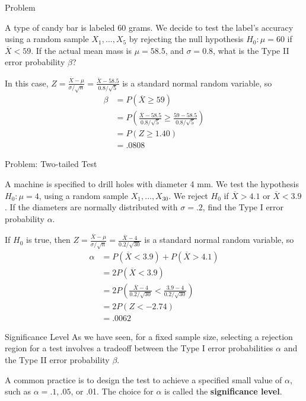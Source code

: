 \documentclass{beamer}
\renewcommand{\emph}{\textbf}
\begin{document}
\begin{frame}{Problem}
\begin{block}{}
A type of candy bar is labeled 60 grams. We decide to test the label's accuracy using a random sample $X_1,\dots,X_5$ by rejecting the null hypothesis $H_0: \mu=60$ if $\overline X<59$. If the actual mean mass is $\mu=58.5$, and $\sigma=0.8$, what is the Type II error probability $\beta$?
\end{block}

\pause In this case, $Z=\frac{\overline X-\mu}{\sigma/\sqrt{n}}=\frac{\overline X-58.5}{0.8/\sqrt{5}}$ is a standard normal random variable, \pause so
\begin{align*}
\beta &= P(\overline X\geq 59) \\
&= P\left(\frac{\overline X-58.5}{0.8/\sqrt5} \geq \frac{59-58.5}{0.8/\sqrt5}\right)\\
&= P(Z \geq 1.40) \\
&= .0808
\end{align*}

\end{frame}

\begin{frame}{Problem: Two-tailed Test}
\begin{block}{}
A machine is specified to drill holes with diameter 4 mm. We test the hypothesis $H_0: \mu=4$, using a random sample $X_1,\dots,X_{30}$. We reject $H_0$ if $\overline X>4.1$ or $\overline X<3.9$. If the diameters are normally distributed with $\sigma=.2$, find the Type I error probability $\alpha$.
\end{block}

\pause If $H_0$ is true, then $Z=\frac{\overline X-\mu}{\sigma/\sqrt{n}}=\frac{\overline X-4}{0.2/\sqrt{30}}$ is a standard normal random variable, \pause so
\begin{align*}
\alpha &= P(\overline X<3.9)+P(\overline X>4.1) \\
&= 2P(\overline X<3.9) \\
&= 2P\left(\frac{\overline X-4}{0.2/\sqrt{30}} < \frac{3.9-4}{0.2/\sqrt{30}}\right)\\
&= 2P(Z < -2.74) \\
&= .0062
\end{align*}
\end{frame}

\begin{frame}{Significance Level}
As we have seen, for a fixed sample size, selecting a rejection region for a test involves a tradeoff between the Type I error probabilities $\alpha$ and the Type II error probability $\beta$. 

\vspace{.2cm}
\pause A common practice is to design the test to achieve a specified small value of $\alpha$, such as $\alpha=.1, .05$, or .01. The choice for $\alpha$ is called the \emph{significance level}.
\end{frame}
\end{document}
